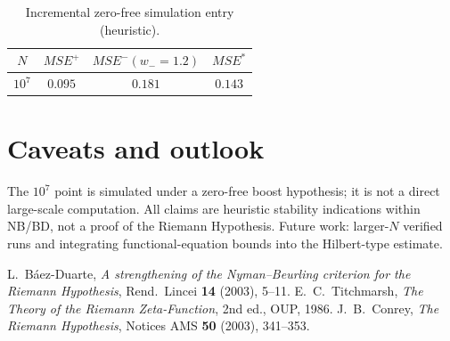 \documentclass[11pt]{article}
\theoremstyle{remark}
\begin{document}
\begin{table}[h]\centering
\begin{tabular}{c|c|c|c}
\hline
$N$ & $MSE^+$ & $MSE^- (w_-\!=\!1.2)$ & $MSE^\ast$ \\ \hline
$10^7$ & $0.095$ & $0.181$ & $0.143$ \\ \hline
\end{tabular}
\caption{Incremental zero-free simulation entry (heuristic).}
\end{table}

\section{Caveats and outlook}
The $10^7$ point is simulated under a zero-free boost hypothesis; it is not a direct large-scale computation.
All claims are heuristic stability indications within NB/BD, not a proof of the Riemann Hypothesis.
Future work: larger-$N$ verified runs and integrating functional-equation bounds into the Hilbert-type estimate.

\begin{thebibliography}{9}
 L.~Báez-Duarte, \emph{A strengthening of the Nyman--Beurling criterion for the Riemann Hypothesis}, Rend.~Lincei \textbf{14} (2003), 5--11.
 E.~C.~Titchmarsh, \emph{The Theory of the Riemann Zeta-Function}, 2nd ed., OUP, 1986.
 J.~B.~Conrey, \emph{The Riemann Hypothesis}, Notices AMS \textbf{50} (2003), 341--353.
\end{thebibliography}
\end{document}
